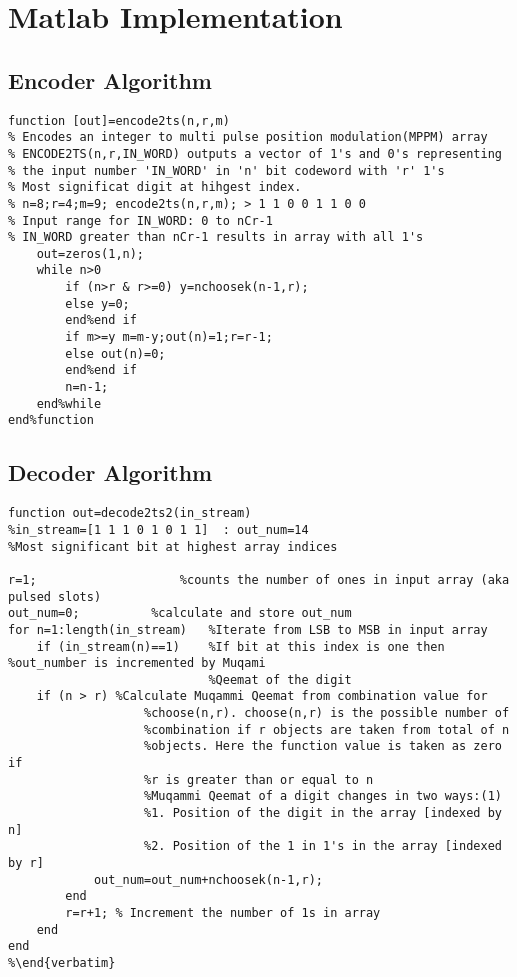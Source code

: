 \chapter{Matlab Implementation}
\label{AppendixA}


\section{Encoder Algorithm}
\begin{lstlisting}[style=Matlab-editor,basicstyle=\footnotesize]
function [out]=encode2ts(n,r,m)
% Encodes an integer to multi pulse position modulation(MPPM) array
% ENCODE2TS(n,r,IN_WORD) outputs a vector of 1's and 0's representing
% the input number 'IN_WORD' in 'n' bit codeword with 'r' 1's
% Most significat digit at hihgest index.
% n=8;r=4;m=9; encode2ts(n,r,m); > 1 1 0 0 1 1 0 0
% Input range for IN_WORD: 0 to nCr-1
% IN_WORD greater than nCr-1 results in array with all 1's
    out=zeros(1,n);
    while n>0
        if (n>r & r>=0) y=nchoosek(n-1,r);
        else y=0;
        end%end if
        if m>=y m=m-y;out(n)=1;r=r-1;
        else out(n)=0;
        end%end if
        n=n-1;
    end%while
end%function
\end{lstlisting}

\newpage
\section{Decoder Algorithm}



\begin{lstlisting}[style=Matlab-editor,basicstyle=\footnotesize]
function out=decode2ts2(in_stream)
%in_stream=[1 1 1 0 1 0 1 1]  : out_num=14
%Most significant bit at highest array indices

r=1;					%counts the number of ones in input array (aka pulsed slots)
out_num=0; 			%calculate and store out_num
for n=1:length(in_stream) 	%Iterate from LSB to MSB in input array
    if (in_stream(n)==1)   	%If bit at this index is one then                       %out_number is incremented by Muqami
                            %Qeemat of the digit
    if (n > r) %Calculate Muqammi Qeemat from combination value for 
                   %choose(n,r). choose(n,r) is the possible number of
                   %combination if r objects are taken from total of n 
                   %objects. Here the function value is taken as zero if
                   %r is greater than or equal to n
                   %Muqammi Qeemat of a digit changes in two ways:(1)
                   %1. Position of the digit in the array [indexed by n]
                   %2. Position of the 1 in 1's in the array [indexed by r]
            out_num=out_num+nchoosek(n-1,r);
        end
        r=r+1; % Increment the number of 1s in array
    end
end
%\end{verbatim}
\end{lstlisting}

